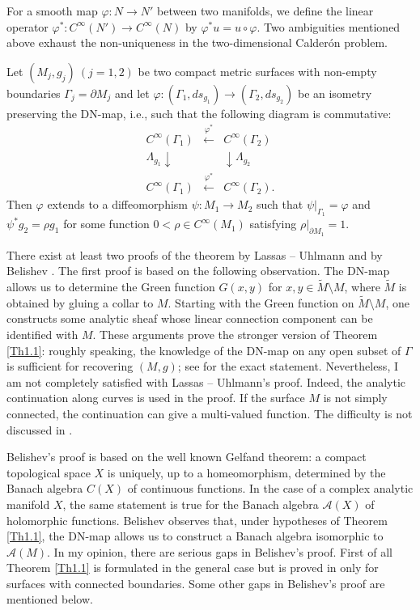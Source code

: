 \documentclass[12pt,reqno]{amsart}
\begin{document}
For a smooth map $\varphi:N\rightarrow N'$ between two manifolds, we define the linear operator
$\varphi^*:C^\infty(N')\rightarrow C^\infty(N)$ by $\varphi^* u=u\circ\varphi$.
Two ambiguities mentioned above exhaust the non-uniqueness in the two-dimensional Calder\'{o}n problem.

\begin{theorem} \label{Th1.1}
Let $(M_j,g_j)\ (j=1,2)$ be two compact metric surfaces with non-empty boundaries $\Gamma_j=\partial M_j$ and let
$\varphi:(\Gamma_1,ds_{g_1})\rightarrow(\Gamma_2,ds_{g_2})$ be an isometry preserving the DN-map, i.e., such that the following diagram is commutative:
$$
\begin{array}{ccc}
C^\infty(\Gamma_1)&\stackrel{\varphi^*}\longleftarrow&C^\infty(\Gamma_2)\\
\Lambda_{g_1}\downarrow&&\downarrow\Lambda_{g_2}\\
C^\infty(\Gamma_1)&\stackrel{\varphi^*}\longleftarrow&C^\infty(\Gamma_2).
\end{array}
$$
Then $\varphi$ extends to a diffeomorphism $\psi:M_1\rightarrow M_2$ such that $\psi|_{\Gamma_1}=\varphi$ and $\psi^*g_2=\rho g_1$ for some function $0<\rho\in C^\infty(M_1)$ satisfying $\rho|_{\partial M_1}=1$.
\end{theorem}

There exist at least two proofs of the theorem by Lassas -- Uhlmann \cite{LaU} and by Belishev \cite{Be}. The first proof is based on the following observation. The DN-map allows us to determine the Green function $G(x,y)$ for $x,y\in\tilde M\setminus M$, where $\tilde M$ is obtained by gluing a collar to $M$. Starting with the Green function on $\tilde M\setminus M$, one constructs some analytic sheaf whose linear connection component can be identified with $M$. These arguments prove the stronger version of Theorem \ref{Th1.1}: roughly speaking, the knowledge of the DN-map on any open subset of $\Gamma$ is sufficient for recovering $(M,g)$; see \cite{LaU} for the exact statement.
Nevertheless, I am not completely satisfied with Lassas -- Uhlmann's proof.
Indeed, the analytic continuation along curves is used in the proof. If the surface $M$ is not simply connected, the continuation can give a multi-valued function. The difficulty is not discussed in \cite{LaU}.

Belishev's proof is based on the well known Gelfand theorem: a compact topological space $X$ is uniquely, up to a homeomorphism, determined by the Banach algebra $C(X)$ of continuous functions. In the case of a complex analytic manifold $X$, the same statement is true for the Banach algebra ${\mathcal A}(X)$ of holomorphic functions. Belishev observes that, under hypotheses of Theorem \ref{Th1.1}, the DN-map allows us to construct a Banach algebra isomorphic to ${\mathcal A}(M)$. In my opinion, there are serious gaps in Belishev's proof. First of all Theorem \ref{Th1.1} is formulated in the general case but is proved in \cite{Be} only for surfaces with connected boundaries. Some other gaps in Belishev's proof are mentioned below.
\end{document}
